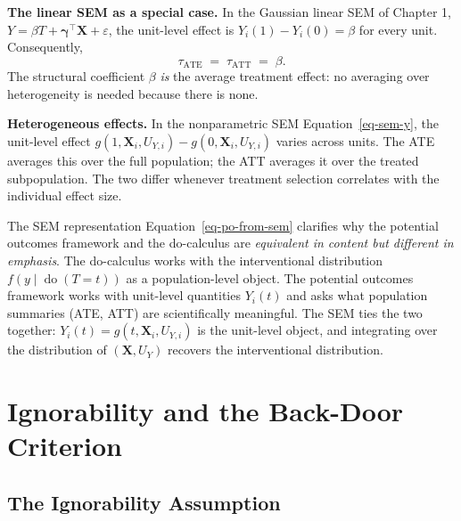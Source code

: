\documentclass[
  a4paper,
]{book}
\newcounter{none} %
\newcommand{\doop}{\operatorname{do}}
\begin{document}
\textbf{The linear SEM as a special case.} In the Gaussian linear SEM of
Chapter 1,
\(Y = \beta T + \boldsymbol{\gamma}^{\top}\mathbf{X} + \varepsilon\),
the unit-level effect is \(Y_i(1) - Y_i(0) = \beta\) for every unit.
Consequently,
\[\tau_{\mathrm{ATE}} \;=\; \tau_{\mathrm{ATT}} \;=\; \beta.\] The
structural coefficient \(\beta\) \emph{is} the average treatment effect:
no averaging over heterogeneity is needed because there is none.

\textbf{Heterogeneous effects.} In the nonparametric SEM
Equation~\ref{eq-sem-y}, the unit-level effect
\(g(1, \mathbf{X}_i, U_{Y,i}) - g(0, \mathbf{X}_i, U_{Y,i})\) varies
across units. The ATE averages this over the full population; the ATT
averages it over the treated subpopulation. The two differ whenever
treatment selection correlates with the individual effect size.

\begin{tcolorbox}[enhanced jigsaw, arc=.35mm, bottomrule=.15mm, bottomtitle=1mm, breakable, colback=white, colbacktitle=quarto-callout-note-color!10!white, colframe=quarto-callout-note-color-frame, coltitle=black, left=2mm, leftrule=.75mm, opacityback=0, opacitybacktitle=0.6, rightrule=.15mm, title={Remark}, titlerule=0mm, toprule=.15mm, toptitle=1mm]

The SEM representation Equation~\ref{eq-po-from-sem} clarifies why the
potential outcomes framework and the do-calculus are \emph{equivalent in
content but different in emphasis}. The do-calculus works with the
interventional distribution \(f(y \mid \doop(T{=}t))\) as a
population-level object. The potential outcomes framework works with
unit-level quantities \(Y_i(t)\) and asks what population summaries
(ATE, ATT) are scientifically meaningful. The SEM ties the two together:
\(Y_i(t) = g(t, \mathbf{X}_i, U_{Y,i})\) is the unit-level object, and
integrating over the distribution of \((\mathbf{X}, U_Y)\) recovers the
interventional distribution.

\end{tcolorbox}

\section{Ignorability and the Back-Door
Criterion}\label{sec-ignorability}

\subsection{The Ignorability
Assumption}\label{the-ignorability-assumption}
\end{document}
